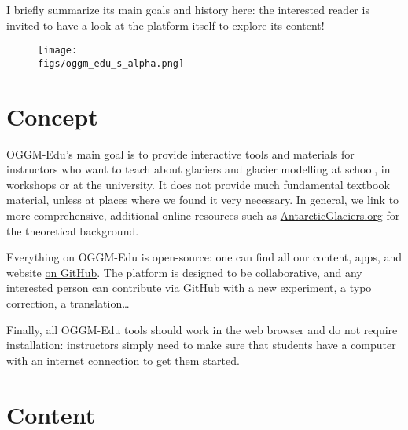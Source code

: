 I briefly summarize its main goals and history here: the interested reader is invited to have a look at
\href{https://edu.oggm.org}{the platform itself} to explore its content!


\begin{figure}[h]
\texttt{[image: \\figs/oggm\_edu\_s\_alpha.png]}
\end{figure}


\section{Concept}

OGGM-Edu’s main goal is to provide interactive tools and materials for instructors who want to
teach about glaciers and glacier modelling at school, in workshops or at the university.
It does not provide much fundamental textbook material, unless at places where we found it very necessary.
In general, we link to more comprehensive, additional online resources such as
\href{http://www.antarcticglaciers.org/}{AntarcticGlaciers.org} for the theoretical background.

Everything on OGGM-Edu is open-source: one can find all our content, apps, and website \href{https://github.com/OGGM/oggm-edu}{on GitHub}.
The platform is designed to be collaborative, and any interested person can contribute via GitHub with a new experiment,
a typo correction, a translation…

Finally, all OGGM-Edu tools should work in the web browser and do not require installation: instructors simply need to
make sure that students have a computer with an internet connection to get them started.


\section{Content}

